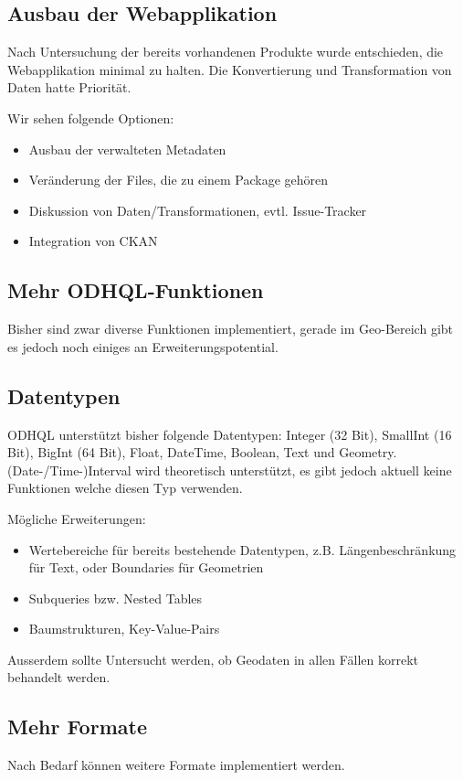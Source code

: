 \subsection{Ausbau der Webapplikation}
Nach Untersuchung der bereits vorhandenen Produkte wurde entschieden, die Webapplikation minimal zu halten. Die Konvertierung und Transformation von Daten hatte Priorität.

Wir sehen folgende Optionen:
\begin{itemize}
\item Ausbau der verwalteten Metadaten
\item Veränderung der Files, die zu einem Package gehören
\item Diskussion von Daten/Transformationen, evtl. Issue-Tracker
\item Integration von CKAN
\end{itemize}

\subsection{Mehr ODHQL-Funktionen}
Bisher sind zwar diverse Funktionen implementiert, gerade im Geo-Bereich gibt es jedoch noch einiges an Erweiterungspotential.

\subsection{Datentypen}
ODHQL unterstützt bisher folgende Datentypen: Integer (32 Bit), SmallInt (16 Bit), BigInt (64 Bit), Float, DateTime, Boolean, Text und Geometry. (Date-/Time-)Interval wird theoretisch unterstützt, es gibt jedoch aktuell keine Funktionen welche diesen Typ verwenden.

Mögliche Erweiterungen:
\begin{itemize}
\item Wertebereiche für bereits bestehende Datentypen, z.B. Längenbeschränkung für Text, oder Boundaries für Geometrien
\item Subqueries bzw. Nested Tables
\item Baumstrukturen, Key-Value-Pairs
\end{itemize}

Ausserdem sollte Untersucht werden, ob Geodaten in allen Fällen korrekt behandelt werden.

\subsection{Mehr Formate}
Nach Bedarf können weitere Formate implementiert werden.

